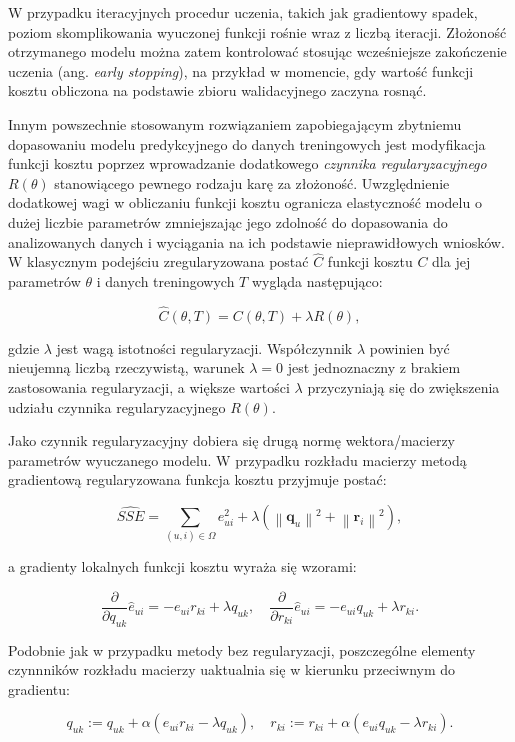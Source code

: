 \documentclass{pracamgr}
\newcommand{\norm}[1]{\left\lVert#1\right\rVert}
\begin{document}
W przypadku iteracyjnych procedur uczenia, takich jak gradientowy spadek, poziom skomplikowania wyuczonej funkcji rośnie wraz z liczbą iteracji. Złożoność otrzymanego modelu można zatem kontrolować stosując wcześniejsze zakończenie uczenia (ang. \textit{early stopping}), na przykład w momencie, gdy wartość funkcji kosztu obliczona na podstawie zbioru walidacyjnego zaczyna rosnąć.

Innym powszechnie stosowanym rozwiązaniem zapobiegającym zbytniemu dopasowaniu modelu predykcyjnego do danych treningowych jest modyfikacja funkcji kosztu poprzez wprowadzanie dodatkowego \textit{czynnika regularyzacyjnego} $R(\theta)$ stanowiącego pewnego rodzaju karę za złożoność. Uwzględnienie dodatkowej wagi w obliczaniu funkcji kosztu ogranicza elastyczność modelu o dużej liczbie parametrów zmniejszając jego zdolność do dopasowania do analizowanych danych i wyciągania na ich podstawie nieprawidłowych wniosków. W klasycznym podejściu zregularyzowana postać $\hat{C}$ funkcji kosztu $C$ dla jej parametrów $\theta$ i danych treningowych $T$ wygląda następująco:

\[
\hat{C}(\theta, T) = C(\theta, T) + \lambda R(\theta),
\]

gdzie $\lambda$ jest wagą istotności regularyzacji. Współczynnik $\lambda$ powinien być nieujemną liczbą rzeczywistą, warunek $\lambda = 0$ jest jednoznaczny z brakiem zastosowania regularyzacji, a większe wartości $\lambda$ przyczyniają się do zwiększenia udziału czynnika regularyzacyjnego $R(\theta)$.

Jako czynnik regularyzacyjny dobiera się drugą normę wektora/macierzy parametrów wyuczanego modelu. W przypadku rozkładu macierzy metodą gradientową regularyzowana funkcja kosztu przyjmuje postać:

\[
\hat{SSE} = \sum_{(u,i) \in \Omega} e_{ui}^2 + \lambda (\norm{\mathbf{q}_{u}}^2 + \norm{\mathbf{r}_{i}}^2),
\]

a gradienty lokalnych funkcji kosztu wyraża się wzorami:

\[
\frac{\partial}{\partial q_{uk}}\hat{e}_{ui} = -e_{ui} r_{ki} + \lambda q_{uk}, \quad
\frac{\partial}{\partial r_{ki}}\hat{e}_{ui} = -e_{ui} q_{uk} + \lambda r_{ki}.
\]

Podobnie jak w przypadku metody bez regularyzacji, poszczególne elementy czynnników rozkładu macierzy uaktualnia się w kierunku przeciwnym do gradientu:

\[
q_{uk} := q_{uk} + \alpha (e_{ui} r_{ki} - \lambda q_{uk}), \quad
r_{ki} := r_{ki} + \alpha (e_{ui} q_{uk} - \lambda r_{ki}).
\]
\end{document}
